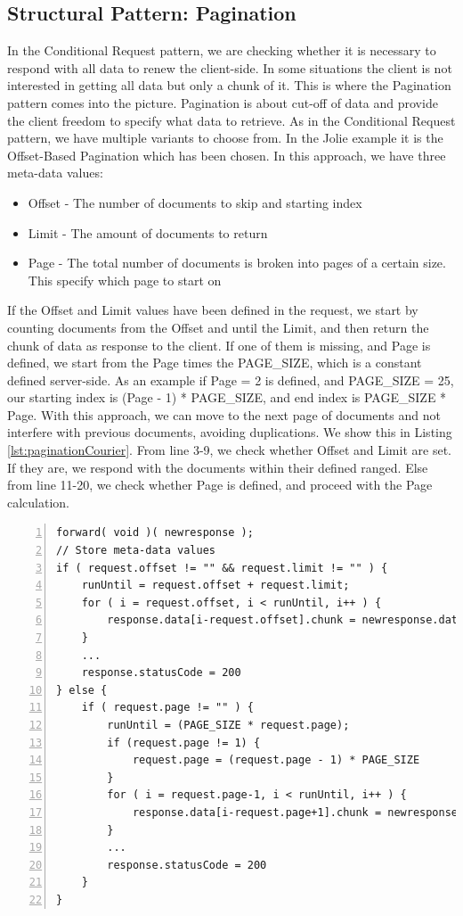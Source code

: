 \documentclass[12pt]{article}
\begin{document}
\subsection{Structural Pattern: Pagination}
In the Conditional Request pattern, we are checking whether it is necessary to respond with all data to renew the client-side. In some situations the client is not interested in getting all data but only a chunk of it. This is where the Pagination pattern \cite{PaginationMAPI} comes into the picture. Pagination is about cut-off of data and provide the client freedom to specify what data to retrieve. As in the Conditional Request pattern, we have multiple variants to choose from. In the Jolie example it is the Offset-Based Pagination which has been chosen. In this approach, we have three meta-data values: 

\begin{itemize}
    \item Offset - The number of documents to skip and starting index
    \item Limit - The amount of documents to return
    \item Page - The total number of documents is broken into pages of a certain size. This specify which page to start on
\end{itemize}

If the Offset and Limit values have been defined in the request, we start by counting documents from the Offset and until the Limit, and then return the chunk of data as response to the client. If one of them is missing, and Page is defined, we start from the Page times the PAGE\_SIZE, which is a constant defined server-side. As an example if Page = 2 is defined, and PAGE\_SIZE = 25, our starting index is (Page - 1) * PAGE\_SIZE, and end index is PAGE\_SIZE * Page. With this approach, we can move to the next page of documents and not interfere with previous documents, avoiding duplications. We show this in Listing \ref{lst:paginationCourier}. From line 3-9, we check whether Offset and Limit are set. If they are, we respond with the documents within their defined ranged. Else from line 11-20, we check whether Page is defined, and proceed with the Page calculation.
\\
\begin{lstlisting}[caption=Courier operations for the Pagination Service, 
    captionpos=b, label={lst:paginationCourier}, frame=single, breaklines=true, numbers=left, basicstyle=\scriptsize]
forward( void )( newresponse );
// Store meta-data values
if ( request.offset != "" && request.limit != "" ) {
    runUntil = request.offset + request.limit;
    for ( i = request.offset, i < runUntil, i++ ) {
        response.data[i-request.offset].chunk = newresponse.data[i].chunk
    }
    ...
    response.statusCode = 200
} else {
    if ( request.page != "" ) {
        runUntil = (PAGE_SIZE * request.page);
        if (request.page != 1) {
            request.page = (request.page - 1) * PAGE_SIZE
        }
        for ( i = request.page-1, i < runUntil, i++ ) {
            response.data[i-request.page+1].chunk = newresponse.data[i].chunk
        }
        ...
        response.statusCode = 200
    }
}   
\end{lstlisting}
\end{document}

